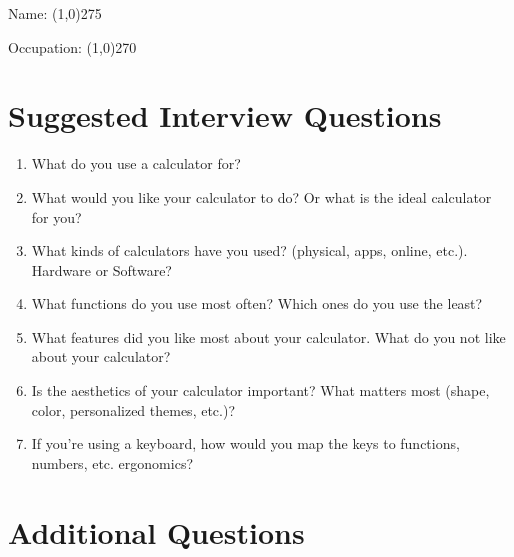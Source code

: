 \documentclass[12pt]{article}
\begin{document}
\maketitle

\begin{center}Name: \line(1,0){275} \end{center}
\begin{center}Occupation: \line(1,0){270} \end{center}

\section{Suggested Interview Questions}

\begin{enumerate}

\item
What do you use a calculator for?

\item
What would you like your calculator to do? Or what is the ideal calculator for you?

\item
What kinds of calculators have you used? (physical, apps, online, etc.). Hardware or Software? 

\item
What functions do you use most often? Which ones do you use the least?

\item
What features did you like most about your calculator. What do you not like about your calculator?

\item
Is the aesthetics of your calculator important? What matters most (shape, color,  personalized themes, etc.)?

\item
If you’re using a keyboard, how would you map the keys to functions, numbers, etc. ergonomics?


\end{enumerate}

\section{Additional Questions}
\end{document}
